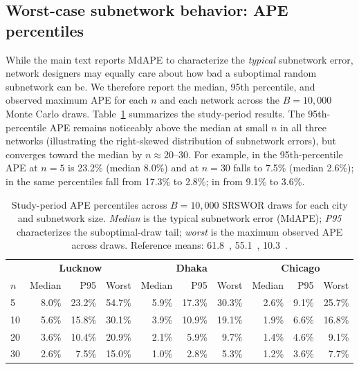 \subsection{Worst-case subnetwork behavior: APE percentiles}\label{sec:si_worst_case}

While the main text reports MdAPE to characterize the \emph{typical} subnetwork error, network designers may equally care about how bad a suboptimal random subnetwork can be. We therefore report the median, 95th percentile, and observed maximum APE for each $n$ and each network across the $B = 10{,}000$ Monte Carlo draws. Table~\ref{tab:si_worst_case_period} summarizes the study-period results. The 95th-percentile APE remains noticeably above the median at small $n$ in all three networks (illustrating the right-skewed distribution of subnetwork errors), but converges toward the median by $n \approx 20$--$30$. For example, in  the 95th-percentile APE at $n=5$ is 23.2\% (median 8.0\%) and at $n=30$ falls to 7.5\% (median 2.6\%); in  the same percentiles fall from 17.3\% to 2.8\%; in  from 9.1\% to 3.6\%.

\begin{table}[ht]
\centering
\small
\caption{Study-period APE percentiles across $B = 10{,}000$ SRSWOR draws for each city and subnetwork size. \emph{Median} is the typical subnetwork error (MdAPE); \emph{P95} characterizes the suboptimal-draw tail; \emph{worst} is the maximum observed APE across draws. Reference means:  61.8~\units,  55.1~\units,  10.3~\units.}
\label{tab:si_worst_case_period}
\begin{tabular}{lrrrrrrrrr}
\toprule
 & \multicolumn{3}{c}{\textbf{Lucknow}} & \multicolumn{3}{c}{\textbf{Dhaka}} & \multicolumn{3}{c}{\textbf{Chicago}} \\
\cmidrule(lr){2-4}\cmidrule(lr){5-7}\cmidrule(lr){8-10}
$n$ & Median & P95 & Worst & Median & P95 & Worst & Median & P95 & Worst \\
\midrule
5 & 8.0\% & 23.2\% & 54.7\% & 5.9\% & 17.3\% & 30.3\% & 2.6\% & 9.1\% & 25.7\% \\
10 & 5.6\% & 15.8\% & 30.1\% & 3.9\% & 10.9\% & 19.1\% & 1.9\% & 6.6\% & 16.8\% \\
20 & 3.6\% & 10.4\% & 20.9\% & 2.1\% & 5.9\% & 9.7\% & 1.4\% & 4.6\% & 9.1\% \\
30 & 2.6\% & 7.5\% & 15.0\% & 1.0\% & 2.8\% & 5.3\% & 1.2\% & 3.6\% & 7.7\% \\
\bottomrule
\end{tabular}
\end{table}


